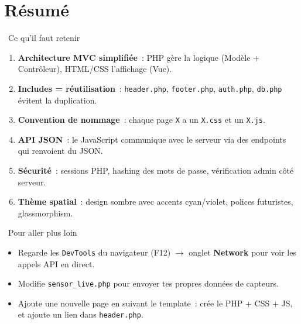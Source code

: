 \documentclass[12pt,a4paper]{article}
\begin{document}
\section{Résumé}

\begin{conceptbox}{\faCheckCircle\ Ce qu'il faut retenir}
\begin{enumerate}
    \item \textbf{Architecture MVC simplifiée}~: PHP gère la logique (Modèle + Contrôleur), HTML/CSS l'affichage (Vue).
    \item \textbf{Includes = réutilisation}~: \texttt{header.php}, \texttt{footer.php}, \texttt{auth.php}, \texttt{db.php} évitent la duplication.
    \item \textbf{Convention de nommage}~: chaque page \texttt{X} a un \texttt{X.css} et un \texttt{X.js}.
    \item \textbf{API JSON}~: le JavaScript communique avec le serveur via des endpoints qui renvoient du JSON.
    \item \textbf{Sécurité}~: sessions PHP, hashing des mots de passe, vérification admin côté serveur.
    \item \textbf{Thème spatial}~: design sombre avec accents cyan/violet, polices futuristes, glassmorphism.
\end{enumerate}
\end{conceptbox}

\begin{tipbox}{\faGraduationCap\ Pour aller plus loin}
\begin{itemize}
    \item Regarde les \texttt{DevTools} du navigateur (F12) $\to$ onglet \textbf{Network} pour voir les appels API en direct.
    \item Modifie \texttt{sensor\_live.php} pour envoyer tes propres données de capteurs.
    \item Ajoute une nouvelle page en suivant le template~: crée le PHP + CSS + JS, et ajoute un lien dans \texttt{header.php}.
\end{itemize}
\end{tipbox}
\end{document}
